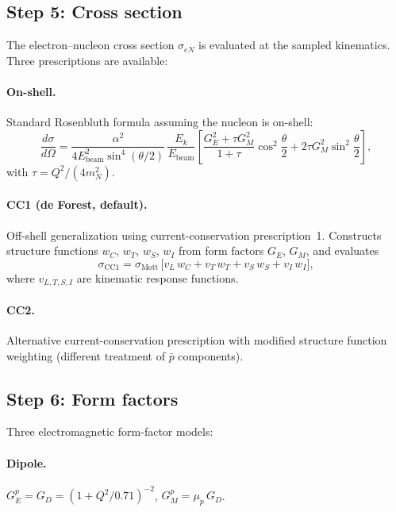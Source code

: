 \documentclass[11pt,a4paper]{article}
\begin{document}
\subsection{Step 5: Cross section}

The electron--nucleon cross section $\sigma_{eN}$ is evaluated at the
sampled kinematics.  Three prescriptions are available:

\paragraph{On-shell.}
Standard Rosenbluth formula assuming the nucleon is on-shell:
\begin{equation}
  \frac{d\sigma}{d\Omega}
  = \frac{\alpha^{2}}{4E_{\text{beam}}^{2}\sin^{4}(\theta/2)}
    \,\frac{E_{k}}{E_{\text{beam}}}
    \left[\frac{G_{E}^{2}+\tau G_{M}^{2}}{1+\tau}\cos^{2}\frac{\theta}{2}
          + 2\tau G_{M}^{2}\sin^{2}\frac{\theta}{2}\right],
\end{equation}
with $\tau = Q^{2}/(4m_{N}^{2})$.

\paragraph{CC1 (de Forest, default).}
Off-shell generalization using current-conservation prescription~1.
Constructs structure functions $w_{C}$, $w_{T}$, $w_{S}$, $w_{I}$ from
form factors $G_{E}$, $G_{M}$, and evaluates
\begin{equation}
  \sigma_{\text{CC1}} = \sigma_{\text{Mott}}\,
    \bigl[v_{L}\,w_{C} + v_{T}\,w_{T} + v_{S}\,w_{S} + v_{I}\,w_{I}\bigr],
\end{equation}
where $v_{L,T,S,I}$ are kinematic response functions.

\paragraph{CC2.}
Alternative current-conservation prescription with modified structure
function weighting (different treatment of $\bar{p}$ components).

\subsection{Step 6: Form factors}

Three electromagnetic form-factor models:

\paragraph{Dipole.}
$G_{E}^{p} = G_{D} = (1 + Q^{2}/0.71)^{-2}$, $G_{M}^{p} = \mu_{p}\,G_{D}$.
\end{document}
